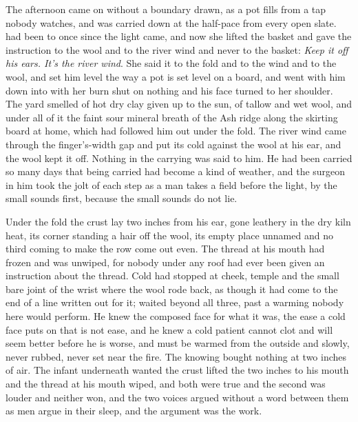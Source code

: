 The afternoon came on without a boundary drawn, as a pot fills from a tap nobody watches, and  was carried down at the half-pace from every open slate.  had been to  once since the light came, and now she lifted the basket and gave the instruction to the wool and to the river wind and never to the basket: \emph{Keep it off his ears. It's the river wind}. She said it to the fold and to the wind and to the wool, and set him level the way a pot is set level on a board, and went with him down  into  with her burn shut on nothing and his face turned to her shoulder. The yard smelled of hot dry clay given up to the sun, of tallow and wet wool, and under all of it the faint sour mineral breath of the Ash ridge along the skirting board at home, which had followed him out under the fold. The river wind came through the finger's-width gap and put its cold against the wool at his ear, and the wool kept it off. Nothing in the carrying was said to him. He had been carried so many days that being carried had become a kind of weather, and the surgeon in him took the jolt of each step as a man takes a field before the light, by the small sounds first, because the small sounds do not lie.

Under the fold the crust lay two inches from his ear, gone leathery in the dry kiln heat, its corner standing a hair off the wool, its empty place unnamed and no third coming to make the row come out even. The thread at his mouth had frozen and was unwiped, for nobody under any roof had ever been given an instruction about the thread. Cold had stopped at cheek, temple and the small bare joint of the wrist where the wool rode back, as though it had come to the end of a line written out for it;  waited beyond all three, past a warming nobody here would perform. He knew the composed face for what it was, the ease a cold face puts on that is not ease, and he knew a cold patient cannot clot and will seem better before he is worse, and must be warmed from the outside and slowly, never rubbed, never set near the fire. The knowing bought nothing at two inches of air. The infant underneath wanted the crust lifted the two inches to his mouth and the thread at his mouth wiped, and both were true and the second was louder and neither won, and the two voices argued without a word between them as men argue in their sleep, and the argument was the work.

